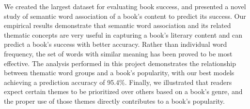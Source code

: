 We created the largest dataset for evaluating book success, and presented a novel study of semantic word association of a book's content to predict its success.
Our empirical results demonstrate that semantic word association and its related thematic concepts are very useful in capturing a book’s literary content and can predict a book's success with better accuracy.  
Rather than individual word frequency, the set of words with similar meaning has been proved to be most effective.
The analysis performed in this project demonstrates the relationship between thematic word groups and a book's popularity, with our best models achieving a prediction accuracy of 95.4\%.
Finally, we illustrated that readers expect certain themes to be prioritized over others based on a book's genre, and the proper use of those themes directly contributes to a book's popularity.